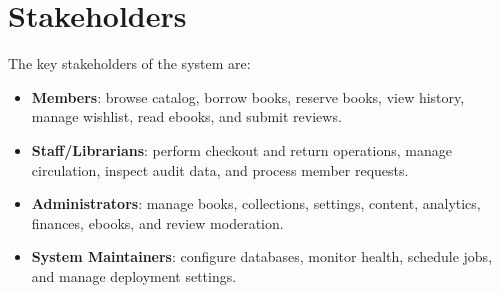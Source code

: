 \documentclass[12pt,a4paper]{report}
\begin{document}
\section{Stakeholders}
The key stakeholders of the system are:
\begin{itemize}[leftmargin=1.5em]
    \item \textbf{Members}: browse catalog, borrow books, reserve books, view history, manage wishlist, read ebooks, and submit reviews.
    \item \textbf{Staff/Librarians}: perform checkout and return operations, manage circulation, inspect audit data, and process member requests.
    \item \textbf{Administrators}: manage books, collections, settings, content, analytics, finances, ebooks, and review moderation.
    \item \textbf{System Maintainers}: configure databases, monitor health, schedule jobs, and manage deployment settings.
\end{itemize}
\end{document}
